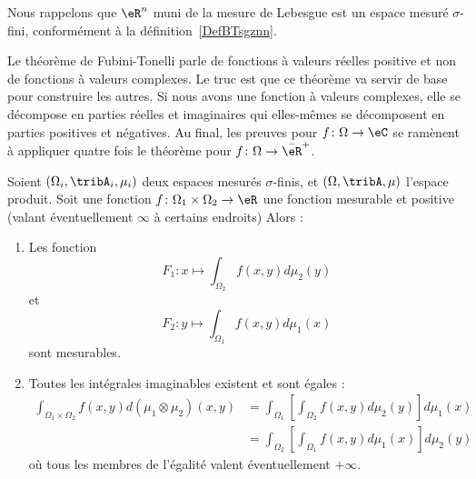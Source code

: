 Nous rappelons que \( \eR^n\) muni de la mesure de Lebesgue est un espace mesuré \( \sigma\)-fini, conformément à la définition~\ref{DefBTsgznn}.

Le théorème de Fubini-Tonelli parle de fonctions à valeurs réelles positive et non de fonctions à valeurs complexes. Le truc est que ce théorème va servir de base pour construire les autres. Si nous avons une fonction à valeurs complexes, elle se décompose en parties réelles et imaginaires qui elles-mêmes se décomposent en parties positives et négatives. Au final, les preuves pour \( f\colon \Omega\to \eC\) se ramènent à appliquer quatre fois le théorème pour \( f\colon \Omega\to \bar \eR^+\).
\begin{theorem}\label{ThoWTMSthY}
	Soient \( (\Omega_i,\tribA_i,\mu_i)\) deux espaces mesurés \( \sigma\)-finis, et \( (\Omega,\tribA,\mu)\) l'espace produit. Soit une fonction \( f\colon \Omega_1\times \Omega_2\to \eR\) une fonction mesurable et positive (valant éventuellement \( \infty\) à certains endroits)
	Alors :
	\begin{enumerate}
		\item       \label{ITEMooUTMNooVIBdpP}
		      Les fonction
		      \begin{equation}        \label{EQooWLADooQwNhEy}
			      F_1\colon x\mapsto \int_{\Omega_2}f(x,y)d\mu_2(y)
		      \end{equation}
		      et
		      \begin{equation}
			      F_2\colon y\mapsto \int_{\Omega_1}f(x,y)d\mu_1(x)
		      \end{equation}
		      sont mesurables.
		\item   \label{ITEMooFKQUooCoCOLV}
		      Toutes les intégrales imaginables existent et sont égales :
		      \begin{subequations}    \label{EqJRVtOGx}
			      \begin{align}
				      \int_{\Omega_1\times \Omega_2}f(x,y)d(\mu_1\otimes \mu_2)(x,y) & =\int_{\Omega_1}\left[ \int_{\Omega_2}f(x,y)d\mu_2(y) \right]d\mu_1(x) \\
				                                                                     & =\int_{\Omega_2}\left[ \int_{\Omega_1}f(x,y)d\mu_1(x) \right]d\mu_2(y)
			      \end{align}
		      \end{subequations}
		      où tous les membres de l'égalité valent éventuellement \( +\infty\).
	\end{enumerate}
\end{theorem}

